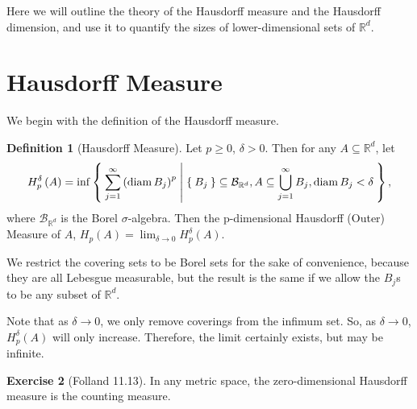 \documentclass[11pt]{amsart}
\theoremstyle{definition}
\newtheorem{definition}{Definition}[section]
\newtheorem{ex}[definition]{Exercise}
\newcommand{\R}{\ensuremath{\mathbb{R}}}
\newcommand{\B}{\ensuremath{\mathcal{B}}}
\DeclareMathOperator{\diam}{diam}
\begin{document}
Here we will outline the theory of the Hausdorff measure and the Hausdorff dimension, and use it to quantify the sizes of lower-dimensional sets of \( \R^d \).

\section{Hausdorff Measure}

We begin with the definition of the Hausdorff measure.

\begin{definition}[Hausdorff Measure]
	Let  \( p \geq 0 \), \( \delta > 0 \). Then for any \( A \subseteq \R^d \), let
	\begin{align}
		H_p^\delta \left( A \right) = 
		\inf \Set{ \sum_{j = 1}^{\infty} \left( \diam B_j \right)^p 
		| \Set{B_j} \subseteq \B_{\R^d} , 
		A \subseteq \bigcup_{j = 1}^{\infty} B_j  , 
		\diam B_j < \delta } ,
	\end{align}
	where \( \B_{\R^d} \) is the Borel \( \sigma \)-algebra.
	Then the p-dimensional Hausdorff (Outer) Measure of \( A \), \( H_p \left( A \right) = \lim_{\delta \rightarrow 0} H_p^\delta \left( A \right)\).
\end{definition}

We restrict the covering sets to be Borel sets for the sake of convenience, because they are all Lebesgue measurable, but the result is the same if we allow the \( B_j \)s to be any subset of \( \R^d \).

Note that as \( \delta \rightarrow 0 \), we only remove coverings from the infimum set. So, as \( \delta \rightarrow 0 \), \( H_p^\delta \left( A \right) \) will only increase. Therefore, the limit certainly exists, but may be infinite. 

\begin{ex}[Folland 11.13]\label{ex:11.13}
	In any metric space, the zero-dimensional Hausdorff measure is the counting measure.
\end{ex}
\end{document}
